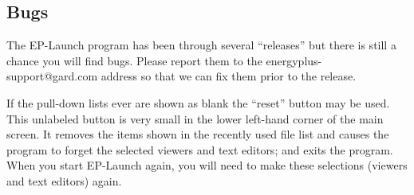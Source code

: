 \subsection{Bugs}\label{bugs}

The EP-Launch program has been through several ``releases'' but there is still a chance you will find bugs. Please report them to the energyplus-support@gard.com address so that we can fix them prior to the release.

If the pull-down lists ever are shown as blank the ``reset'' button may be used. This unlabeled button is very small in the lower left-hand corner of the main screen. It removes the items shown in the recently used file list and causes the program to forget the selected viewers and text editors; and exits the program. When you start EP-Launch again, you will need to make these selections (viewers and text editors) again.
